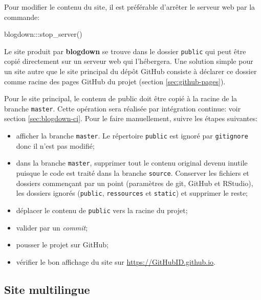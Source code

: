 \documentclass[
  11pt,
  french,
  a4paper,
  extrafontsizes,onecolumn,openright
  ]{memoir}
\newenvironment{Shaded}{\begin{snugshade}}{\end{snugshade}}
\newcommand{\FunctionTok}[1]{\textcolor[rgb]{0.00,0.00,0.00}{#1}}
\newcommand{\NormalTok}[1]{#1}
\newcommand{\SpecialCharTok}[1]{\textcolor[rgb]{0.00,0.00,0.00}{#1}}
\providecommand{\tightlist}{%
  \setlength{\itemsep}{0pt}\setlength{\parskip}{0pt}}
\begin{document}
Pour modifier le contenu du site, il est préférable d'arrêter le serveur web par la commande:

\scriptsize

\begin{Shaded}
\begin{Highlighting}[]
\NormalTok{blogdown}\SpecialCharTok{:::}\FunctionTok{stop\_server}\NormalTok{()}
\end{Highlighting}
\end{Shaded}

\normalsize

Le site produit par \textbf{blogdown} se trouve dans le dossier \texttt{public} qui peut être copié directement sur un serveur web qui l'hébergera.
Une solution simple pour un site autre que le site principal du dépôt GitHub consiste à déclarer ce dossier comme racine des pages GitHub du projet
(section \ref{sec:github-pages}).

Pour le site principal, le contenu de public doit être copié à la racine de la branche \texttt{master}.
Cette opération sera réalisée par intégration continue: voir section \ref{sec:blogdown-ci}.
Pour le faire manuellement, suivre les étapes suivantes:

\begin{itemize}
\tightlist
\item
  afficher la branche \texttt{master}. Le répertoire \texttt{public} est ignoré par \texttt{gitignore} donc il n'est pas modifié;
\item
  dans la branche \texttt{master}, supprimer tout le contenu original devenu inutile puisque le code est traité dans la branche \texttt{source}. Conserver les fichiers et dossiers commençant par un point (paramètres de git, GitHub et RStudio), les dossiers ignorés (\texttt{public}, \texttt{ressources} et \texttt{static}) et supprimer le reste;
\item
  déplacer le contenu de \texttt{public} vers la racine du projet;
\item
  valider par un \emph{commit};
\item
  pousser le projet sur GitHub;
\item
  vérifier le bon affichage du site sur \url{https://GitHubID.github.io}.
\end{itemize}

\hypertarget{site-multilingue}{%
\subsection{Site multilingue}\label{site-multilingue}}
\end{document}

